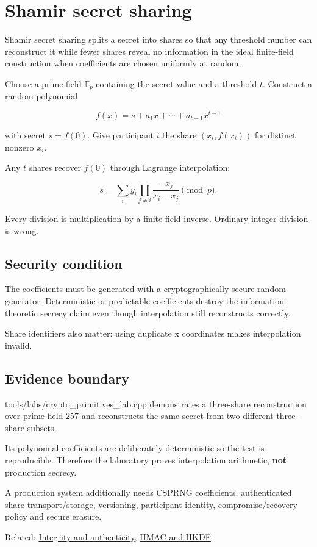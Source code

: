 \hypertarget{appendix-5888fd6102dc}{}
\section{Shamir secret sharing}\label{appendix-5888fd6102dc-shamir-secret-sharing}

Shamir secret sharing splits a secret into shares so that any threshold number can reconstruct it while fewer shares reveal no information in the ideal finite-field construction when coefficients are chosen uniformly at random.

Choose a prime field \(\mathbb F_p\) containing the secret value and a threshold \(t\). Construct a random polynomial

\[
f(x)=s+a_1x+\cdots+a_{t-1}x^{t-1}
\]

with secret \(s=f(0)\). Give participant \(i\) the share \((x_i,f(x_i))\) for distinct nonzero \(x_i\).

Any \(t\) shares recover \(f(0)\) through Lagrange interpolation:

\[
s=
\sum_i y_i
\prod_{j\ne i}
\frac{-x_j}{x_i-x_j}
\pmod p.
\]

Every division is multiplication by a finite-field inverse. Ordinary integer division is wrong.

\subsection{Security condition}\label{appendix-5888fd6102dc-security-condition}

The coefficients must be generated with a cryptographically secure random generator. Deterministic or predictable coefficients destroy the information-theoretic secrecy claim even though interpolation still reconstructs correctly.

Share identifiers also matter: using duplicate x coordinates makes interpolation invalid.

\subsection{Evidence boundary}\label{appendix-5888fd6102dc-evidence-boundary}

tools/labs/crypto\_primitives\_lab.cpp demonstrates a three-share reconstruction over prime field 257 and reconstructs the same secret from two different three-share subsets.

Its polynomial coefficients are deliberately deterministic so the test is reproducible. Therefore the laboratory proves interpolation arithmetic, \textbf{not} production secrecy.

A production system additionally needs CSPRNG coefficients, authenticated share transport/storage, versioning, participant identity, compromise/recovery policy and secure erasure.

Related: \hyperref[appendix-cbe594d1ab0a]{Integrity and authenticity}, \hyperref[appendix-50af792c9da7]{HMAC and HKDF}.
